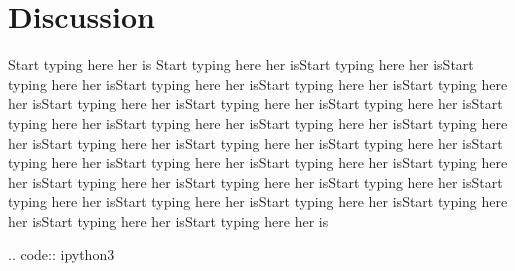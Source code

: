 \documentclass[conference]{IEEEtran}
\begin{document}
\section{Discussion}
Start typing here her is Start typing here her isStart typing here her isStart typing here her isStart typing here her isStart typing here her isStart typing here her isStart typing here her isStart typing here her isStart typing here her isStart typing here her isStart typing here her isStart typing here her isStart typing here her isStart typing here her isStart typing here her isStart typing here her isStart typing here her isStart typing here her isStart typing here her isStart typing here her isStart typing here her isStart typing here her isStart typing here her isStart typing here her isStart typing here her isStart typing here her isStart typing here her isStart typing here her isStart typing here her is

.. code:: ipython3

    
\end{document}
